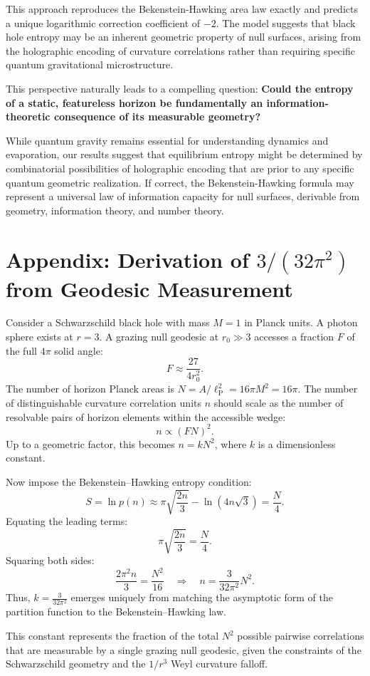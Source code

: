 \documentclass[12pt, letterpaper]{article}
\newcommand{\ellp}{\ell_{\mathrm{P}}}
\begin{document}
This approach reproduces the Bekenstein-Hawking area law exactly and predicts a unique logarithmic correction coefficient of $-2$. The model suggests that black hole entropy may be an inherent geometric property of null surfaces, arising from the holographic encoding of curvature correlations rather than requiring specific quantum gravitational microstructure.

This perspective naturally leads to a compelling question: \textbf{Could the entropy of a static, featureless horizon be fundamentally an information-theoretic consequence of its measurable geometry?}

While quantum gravity remains essential for understanding dynamics and evaporation, our results suggest that equilibrium entropy might be determined by combinatorial possibilities of holographic encoding that are prior to any specific quantum geometric realization. If correct, the Bekenstein-Hawking formula may represent a universal law of information capacity for null surfaces, derivable from geometry, information theory, and number theory.

\section*{Appendix: Derivation of $3/(32\pi^2)$ from Geodesic Measurement}

Consider a Schwarzschild black hole with mass $M=1$ in Planck units. A photon sphere exists at $r = 3$. A grazing null geodesic at $r_0 \gg 3$ accesses a fraction $F$ of the full $4\pi$ solid angle:
\[
F \approx \frac{27}{4 r_0^2}.
\]
The number of horizon Planck areas is $N = A/\ellp^2 = 16\pi M^2 = 16\pi$. The number of distinguishable curvature correlation units $n$ should scale as the number of resolvable pairs of horizon elements within the accessible wedge:
\[
n \propto (F N)^2.
\]
Up to a geometric factor, this becomes $n = k N^2$, where $k$ is a dimensionless constant.

Now impose the Bekenstein–Hawking entropy condition:
\[
S = \ln p(n) \approx \pi \sqrt{\frac{2n}{3}} - \ln(4n\sqrt{3}) = \frac{N}{4}.
\]
Equating the leading terms:
\[
\pi \sqrt{\frac{2n}{3}} = \frac{N}{4}.
\]
Squaring both sides:
\[
\frac{2\pi^2 n}{3} = \frac{N^2}{16} \quad \Rightarrow \quad n = \frac{3}{32\pi^2} N^2.
\]
Thus, $k = \frac{3}{32\pi^2}$ emerges uniquely from matching the asymptotic form of the partition function to the Bekenstein–Hawking law.

This constant represents the fraction of the total $N^2$ possible pairwise correlations that are measurable by a single grazing null geodesic, given the constraints of the Schwarzschild geometry and the $1/r^3$ Weyl curvature falloff.
\end{document}

